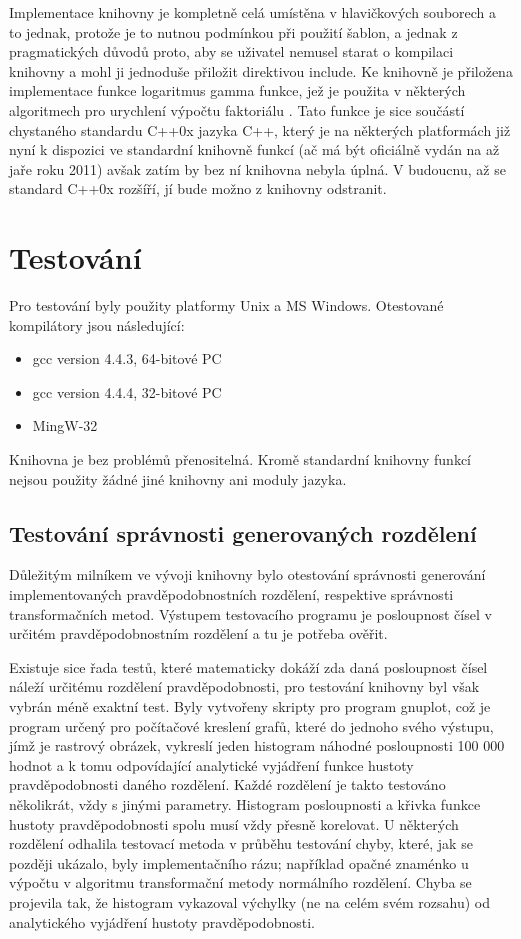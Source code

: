\documentclass[a4paper,11pt]{article}
\begin{document}
Implementace knihovny je kompletně celá umístěna v hlavičkových souborech a to jednak, protože je to nutnou podmínkou při použití šablon, a jednak z pragmatických důvodů proto, aby se uživatel nemusel starat o kompilaci knihovny a mohl ji jednoduše přiložit direktivou include. Ke knihovně je přiložena implementace funkce logaritmus gamma funkce, jež je použita v některých algoritmech pro urychlení výpočtu faktoriálu \cite{NR}. Tato funkce je sice součástí chystaného standardu C++0x jazyka C++, který je na některých platformách již nyní k dispozici ve standardní knihovně funkcí (ač má být oficiálně vydán na až jaře roku 2011) avšak zatím by bez ní knihovna nebyla úplná. V budoucnu, až se standard C++0x rozšíří, jí bude možno z knihovny odstranit.


\section{Testování}
Pro testování byly použity platformy Unix a MS Windows. Otestované kompilátory jsou následující:
\begin{itemize}
\item gcc version 4.4.3, 64-bitové PC
\item gcc version 4.4.4, 32-bitové PC
\item MingW-32
\end{itemize}

Knihovna je bez problémů přenositelná. Kromě standardní knihovny funkcí nejsou použity žádné jiné knihovny ani moduly jazyka.

\subsection{Testování správnosti generovaných rozdělení}

Důležitým milníkem ve vývoji knihovny bylo otestování správnosti generování implementovaných pravděpodobnostních rozdělení, respektive správnosti transformačních metod. Výstupem testovacího programu je posloupnost čísel v určitém pravděpodobnostním rozdělení a tu je potřeba ověřit.

Existuje sice řada testů, které matematicky dokáží zda daná posloupnost čísel náleží určitému rozdělení pravděpodobnosti, pro testování knihovny byl však vybrán méně exaktní test. Byly vytvořeny skripty pro program gnuplot, což je program určený pro počítačové kreslení grafů, které do jednoho svého výstupu, jímž je rastrový obrázek, vykreslí jeden histogram náhodné posloupnosti 100 000 hodnot a k tomu odpovídající analytické vyjádření funkce hustoty pravděpodobnosti daného rozdělení. Každé rozdělení je takto testováno několikrát, vždy s jinými parametry. Histogram posloupnosti a křivka funkce hustoty pravděpodobnosti spolu musí vždy přesně korelovat. U některých rozdělení odhalila testovací metoda v průběhu testování chyby, které, jak se později ukázalo, byly implementačního rázu; například opačné znaménko u výpočtu v algoritmu transformační metody normálního rozdělení. Chyba se projevila tak, že histogram vykazoval výchylky (ne na celém svém rozsahu) od analytického vyjádření hustoty pravděpodobnosti.
\end{document}
